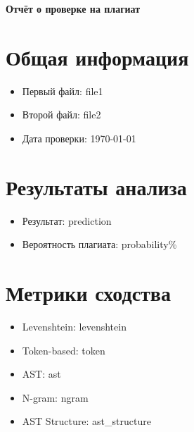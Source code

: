 \documentclass[a4paper,12pt]{article}
\begin{document}
\begin{center}
    \textbf{\Large Отчёт о проверке на плагиат}
\end{center}

\vspace{0.5cm}

\section*{Общая информация}
\begin{itemize}
    \item Первый файл: {file1}
    \item Второй файл: {file2}
    \item Дата проверки: \today
\end{itemize}

\section*{Результаты анализа}
\begin{itemize}
    \item Результат: {prediction}
    \item Вероятность плагиата: {probability}\%
\end{itemize}

\section*{Метрики сходства}
\begin{itemize}
    \item Levenshtein: {levenshtein}
    \item Token-based: {token}
    \item AST: {ast}
    \item N-gram: {ngram}
    \item AST Structure: {ast_structure}
\end{itemize}
\end{document}
